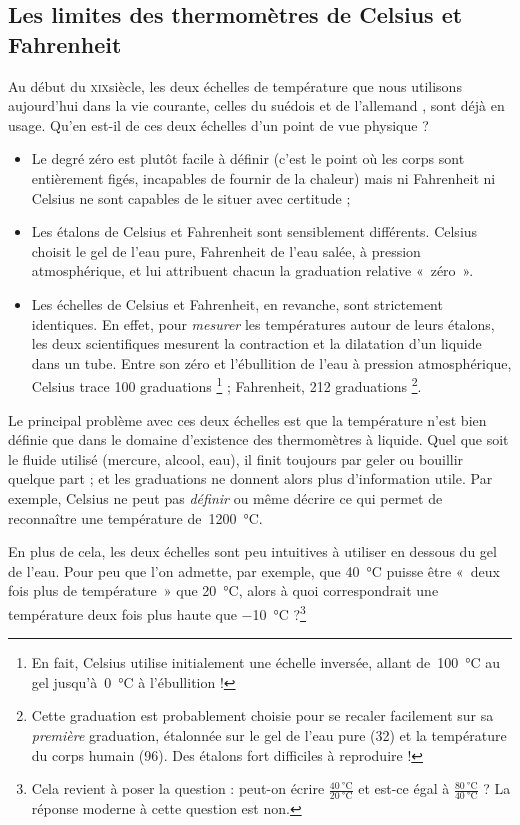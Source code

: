 	\subsection{Les limites des thermomètres de Celsius et Fahrenheit}
	
		Au début du \textsc{xix}\ieme siècle, les deux échelles de température que nous utilisons aujourd’hui dans la vie courante, celles du suédois  et de l’allemand , sont déjà en usage. Qu’en est-il de ces deux échelles d’un point de vue physique ?
			
		\begin{itemize}
			\item Le degré zéro est plutôt facile à définir (c’est le point où les corps sont entièrement figés, incapables de fournir de la chaleur) mais ni Fahrenheit ni Celsius ne sont capables de le situer avec certitude ;
			\item Les étalons de Celsius et Fahrenheit sont sensiblement différents. Celsius choisit le gel de l’eau pure, Fahrenheit de l’eau salée, à pression atmosphérique, et lui attribuent chacun la graduation relative «~zéro~».
			\item Les échelles de Celsius et Fahrenheit, en revanche, sont strictement identiques. En effet, pour \emph{mesurer} les températures autour de leurs étalons, les deux scientifiques mesurent la contraction et la dilatation d’un liquide dans un tube. Entre son zéro et l’ébullition de l’eau à pression atmosphérique, Celsius trace 100 graduations%
			\footnote{En fait, Celsius utilise initialement une échelle inversée, allant de~\SI{100}{\celsius} au gel jusqu’à~\SI{0}{\celsius} à l’ébullition !} ; Fahrenheit, 212 graduations%
			\footnote{Cette graduation est probablement choisie pour se recaler facilement sur sa \emph{première} graduation, étalonnée sur le gel de l’eau pure (32) et la température du corps humain (96). Des étalons fort difficiles à reproduire !}.
		\end{itemize}
		
		Le principal problème avec ces deux échelles est que la température n’est bien définie que dans le domaine d’existence des thermomètres à liquide. Quel que soit le fluide utilisé (mercure, alcool, eau), il finit toujours par geler ou bouillir quelque part ; et les graduations ne donnent alors plus d’information utile. Par exemple, Celsius ne peut pas \emph{définir} ou même décrire ce qui permet de reconnaître une température de~\SI{1200}{\celsius}.
		
		En plus de cela, les deux échelles sont peu intuitives à utiliser en dessous du gel de l’eau. Pour peu que l’on admette, par exemple, que \SI{40}{\celsius} puisse être «~deux fois plus de température~» que \SI{20}{\celsius}, alors à quoi correspondrait une température deux fois plus haute que \SI{-10}{\celsius} ?\footnote{Cela revient à poser la question : peut-on écrire $\frac{\SI{40}{\celsius}}{\SI{20}{\celsius}}$ et est-ce égal à $\frac{\SI{80}{\celsius}}{\SI{40}{\celsius}}$ ? La réponse moderne à cette question est non.}
		
